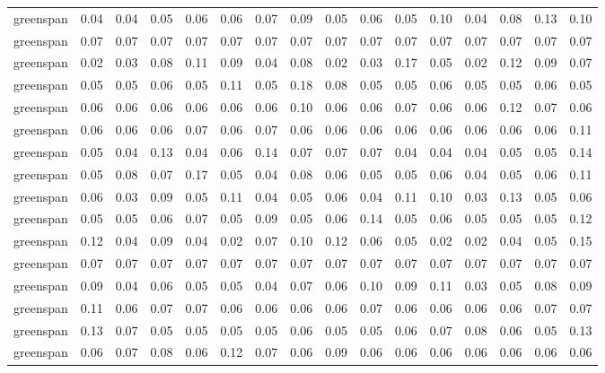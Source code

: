 \begin{tabular}{lrrrrrrrrrrrrrrr}
 greenspan & 0.04 & 0.04 & 0.05 & 0.06 & 0.06 & 0.07 & 0.09 & 0.05 & 0.06 &  0.05 &  0.10 &  0.04 &  0.08 &  0.13 &  0.10 \\
 greenspan & 0.07 & 0.07 & 0.07 & 0.07 & 0.07 & 0.07 & 0.07 & 0.07 & 0.07 &  0.07 &  0.07 &  0.07 &  0.07 &  0.07 &  0.07 \\
 greenspan & 0.02 & 0.03 & 0.08 & 0.11 & 0.09 & 0.04 & 0.08 & 0.02 & 0.03 &  0.17 &  0.05 &  0.02 &  0.12 &  0.09 &  0.07 \\
 greenspan & 0.05 & 0.05 & 0.06 & 0.05 & 0.11 & 0.05 & 0.18 & 0.08 & 0.05 &  0.05 &  0.06 &  0.05 &  0.05 &  0.06 &  0.05 \\
 greenspan & 0.06 & 0.06 & 0.06 & 0.06 & 0.06 & 0.06 & 0.10 & 0.06 & 0.06 &  0.07 &  0.06 &  0.06 &  0.12 &  0.07 &  0.06 \\
 greenspan & 0.06 & 0.06 & 0.06 & 0.07 & 0.06 & 0.07 & 0.06 & 0.06 & 0.06 &  0.06 &  0.06 &  0.06 &  0.06 &  0.06 &  0.11 \\
 greenspan & 0.05 & 0.04 & 0.13 & 0.04 & 0.06 & 0.14 & 0.07 & 0.07 & 0.07 &  0.04 &  0.04 &  0.04 &  0.05 &  0.05 &  0.14 \\
 greenspan & 0.05 & 0.08 & 0.07 & 0.17 & 0.05 & 0.04 & 0.08 & 0.06 & 0.05 &  0.05 &  0.06 &  0.04 &  0.05 &  0.06 &  0.11 \\
 greenspan & 0.06 & 0.03 & 0.09 & 0.05 & 0.11 & 0.04 & 0.05 & 0.06 & 0.04 &  0.11 &  0.10 &  0.03 &  0.13 &  0.05 &  0.06 \\
 greenspan & 0.05 & 0.05 & 0.06 & 0.07 & 0.05 & 0.09 & 0.05 & 0.06 & 0.14 &  0.05 &  0.06 &  0.05 &  0.05 &  0.05 &  0.12 \\
 greenspan & 0.12 & 0.04 & 0.09 & 0.04 & 0.02 & 0.07 & 0.10 & 0.12 & 0.06 &  0.05 &  0.02 &  0.02 &  0.04 &  0.05 &  0.15 \\
 greenspan & 0.07 & 0.07 & 0.07 & 0.07 & 0.07 & 0.07 & 0.07 & 0.07 & 0.07 &  0.07 &  0.07 &  0.07 &  0.07 &  0.07 &  0.07 \\
 greenspan & 0.09 & 0.04 & 0.06 & 0.05 & 0.05 & 0.04 & 0.07 & 0.06 & 0.10 &  0.09 &  0.11 &  0.03 &  0.05 &  0.08 &  0.09 \\
 greenspan & 0.11 & 0.06 & 0.07 & 0.07 & 0.06 & 0.06 & 0.06 & 0.06 & 0.07 &  0.06 &  0.06 &  0.06 &  0.06 &  0.07 &  0.07 \\
 greenspan & 0.13 & 0.07 & 0.05 & 0.05 & 0.05 & 0.05 & 0.06 & 0.05 & 0.05 &  0.06 &  0.07 &  0.08 &  0.06 &  0.05 &  0.13 \\
 greenspan & 0.06 & 0.07 & 0.08 & 0.06 & 0.12 & 0.07 & 0.06 & 0.09 & 0.06 &  0.06 &  0.06 &  0.06 &  0.06 &  0.06 &  0.06 \\

\end{tabular}
